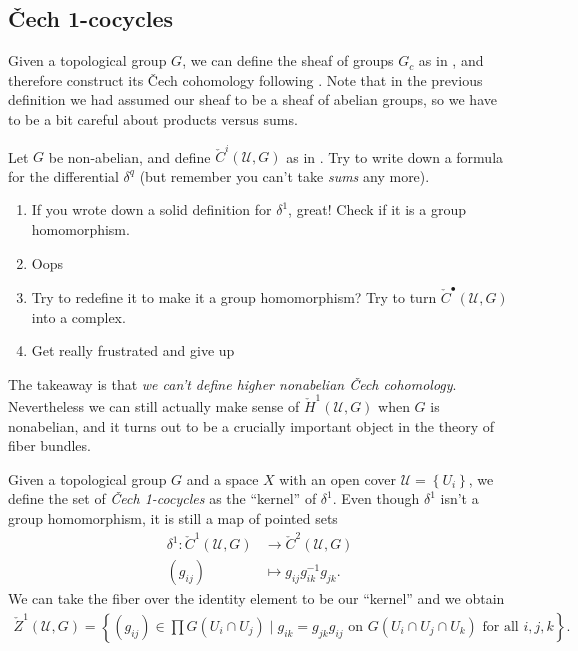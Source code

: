 \documentclass[11pt]{amsart}
\begin{document}
\subsection{\v{C}ech 1-cocycles}

Given a topological group $G$, we can define the sheaf of groups $G_c$ as in , 
and therefore construct its \v{C}ech cohomology following . Note that in the previous definition we had assumed our sheaf to be a sheaf of abelian groups, so we have to be a bit careful about products versus sums.

\begin{exercise}[Suggested] Let $G$ be non-abelian, and define $\check{C}^i(\mathcal{U},G)$ as in . Try to write down a formula for the differential $\delta^q$ (but remember you can't take \emph{sums} any more).
\begin{enumerate}
    \item If you wrote down a solid definition for $\delta^1$, great! Check if it is a group homomorphism.
    \item Oops
    \item Try to redefine it to make it a group homomorphism? Try to turn $\check{C}^\bullet(\mathcal{U},G)$ into a complex.
    \item Get really frustrated and give up
\end{enumerate}
\end{exercise}

The takeaway is that \emph{we can't define higher nonabelian \v{C}ech cohomology}. Nevertheless we can still actually make sense of $\check{H}^1(\mathcal{U},G)$ when $G$ is nonabelian, and it turns out to be a crucially important object in the theory of fiber bundles.

\begin{definition}\label{def:equivalence-of-1-cocycles} 
Given a topological group $G$ and a space $X$ with an open cover $\mathcal{U} = \left\{ U_i \right\}$, we define the set of \emph{\v{C}ech 1-cocycles} as the ``kernel'' of $\delta^1$. Even though $\delta^1$ isn't a group homomorphism, it is still a map of pointed sets
\begin{align*}
    \delta^1 \colon \check{C}^1(\mathcal{U},G) &\to \check{C}^2(\mathcal{U},G) \\
    (g_{ij}) &\mapsto g_{ij}g_{ik}^{-1} g_{jk}.
\end{align*}
We can take the fiber over the identity element to be our ``kernel'' and we obtain
\begin{align*}
    \check{Z}^1(\mathcal{U},G) = \left\{ (g_{ij}) \in \prod G(U_i \cap U_j) \mid g_{ik} = g_{jk} g_{ij} \text{ on } G(U_i \cap U_j\cap U_k) \text{ for all }i,j,k \right\}.
\end{align*}
\end{definition}
\end{document}
